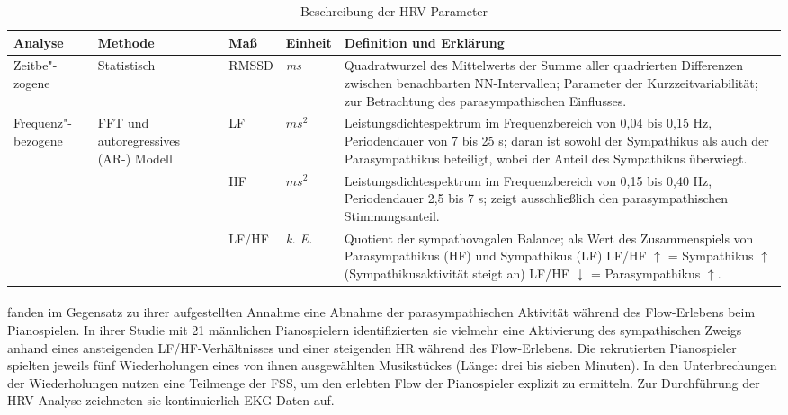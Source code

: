 \begin{table}
	[ht] \caption[Beschreibung der HRV-Parameter]{Beschreibung der HRV-Parameter} \label{tab:beschreibung_der_hrv_parameter} 
	\begin{tabularx}
		{ 
		\textwidth}{p{} p{} p{} p{} X} \toprule Analyse & Methode & Maß & Einheit & Definition und Erklärung \\
		\midrule Zeitbe"-zogene & Statistisch & \acs{RMSSD} & \emph{ms} & Quadratwurzel des Mittelwerts der Summe aller quadrierten Differenzen zwischen benachbarten NN-Intervallen; Parameter der Kurzzeitvariabilität; zur Betrachtung des parasympathischen Einflusses. \\
		\hline
		
		Frequenz"-bezogene & \acs{FFT} und autoregressives (AR-) Modell & \acs{LF} & $ms^{2}$ & Leistungsdichtespektrum im Frequenzbereich von 0,04 bis 0,15 Hz, Periodendauer von 7 bis 25 s; daran ist sowohl der Sympathikus als auch der Parasympathikus beteiligt, wobei der Anteil des Sympathikus überwiegt. \\
		\cline{3-5}
		
		& & \acs{HF} & $ms^{2}$ & Leistungsdichtespektrum im Frequenzbereich von 0,15 bis 0,40 Hz, Periodendauer 2,5 bis 7 s; zeigt ausschließlich den parasympathischen Stimmungsanteil. \\
		\cline{3-5}
		
		& & LF/HF & \emph{k. E.} & Quotient der sympathovagalen Balance; als Wert des Zusammenspiels von Parasympathikus (HF) und Sympathikus (LF) LF/HF $\uparrow{}$ = Sympathikus $\uparrow{}$ (Sympathikusaktivität steigt an) LF/HF $\downarrow{}$ = Parasympathikus $\uparrow{}$. \\
		\bottomrule 
	\end{tabularx}
\end{table}

\paragraph{\citet{deManzano2010}} 

\label{par:demanzano2010}

\citet{deManzano2010} fanden im Gegensatz zu ihrer aufgestellten Annahme eine Abnahme der parasympathischen Aktivität während des Flow-Erlebens beim Pianospielen. In ihrer Studie mit 21 männlichen Pianospielern identifizierten sie vielmehr eine Aktivierung des sympathischen Zweigs anhand eines ansteigenden LF/HF-Verhältnisses und einer steigenden \ac{HR} während des Flow-Erlebens. Die rekrutierten Pianospieler spielten jeweils fünf Wiederholungen eines von ihnen ausgewählten Musikstückes (Länge: drei bis sieben Minuten). In den Unterbrechungen der Wiederholungen nutzen \citet{deManzano2010} eine Teilmenge der \ac{FSS}, um den erlebten Flow der Pianospieler explizit zu ermitteln. Zur Durchführung der \ac{HRV}-Analyse zeichneten sie kontinuierlich \ac{EKG}-Daten auf.

